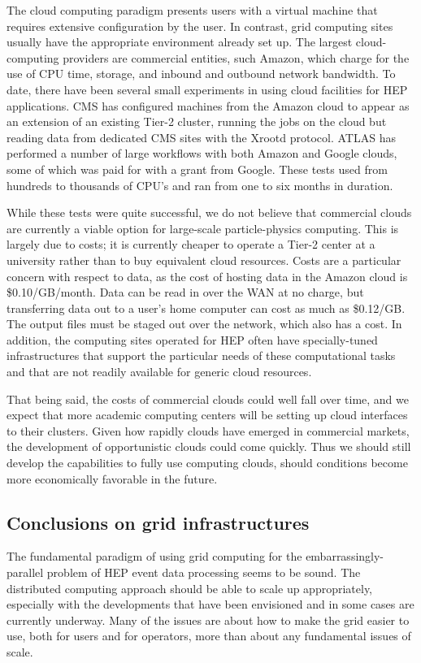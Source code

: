 The cloud computing paradigm presents users with a virtual machine that requires extensive configuration by the user.  In contrast, grid computing sites usually have the appropriate environment already set up.  The largest cloud-computing providers are commercial entities, such Amazon, which charge for the use of CPU time, storage, and inbound and outbound network bandwidth.  To date, there have been several small experiments in using cloud facilities for HEP applications.  CMS has configured machines from the Amazon cloud to appear as an extension of an existing Tier-2 cluster, running the jobs on the cloud but reading data from dedicated CMS sites with the Xrootd protocol.  ATLAS has performed a number of large workflows with both Amazon and Google clouds, some of which was paid for with a grant from Google.  These tests used from hundreds to thousands of CPU’s and ran from one to six months in duration.

While these tests were quite successful, we do not believe that commercial clouds are currently a viable option for large-scale particle-physics computing.  This is largely due to costs; it is currently cheaper to operate a Tier-2 center at a university rather than to buy equivalent cloud resources.  Costs are a particular concern with respect to data, as the cost of hosting data in the Amazon cloud is \$0.10/GB/month.  Data can be read in over the WAN at no charge, but transferring data out to a user’s home computer can cost as much as \$0.12/GB.   The output files must be staged out over the network, which also has a cost.  In addition, the computing sites operated for HEP often have specially-tuned infrastructures that support the particular needs of these computational tasks and that are not readily available for generic cloud resources.

That being said, the costs of commercial clouds could well fall over time, and we expect that more academic computing centers will be setting up cloud interfaces to their clusters.  Given how rapidly clouds have emerged in commercial markets, the development of opportunistic clouds could come quickly.  Thus we should still develop the capabilities to fully use computing clouds, should conditions become more economically favorable in the future.

\subsection{Conclusions on grid infrastructures}

The fundamental paradigm of using grid computing for the embarrassingly-parallel problem of HEP event data processing seems to be sound.  The distributed computing approach should be able to scale up appropriately, especially with the developments that have been envisioned and in some cases are currently underway.  Many of the issues are about how to make the grid easier to use, both for users and for operators, more than about any fundamental issues of scale.

